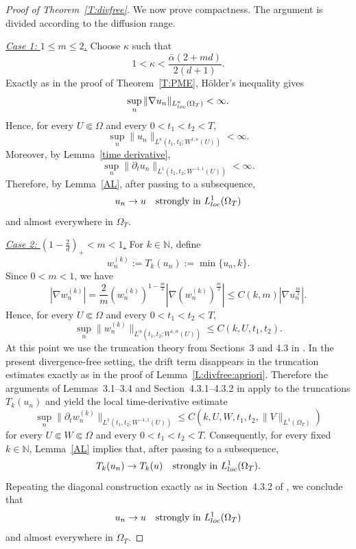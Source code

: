 \documentclass{amsart}
\numberwithin{equation}{section}
\begin{document}
\begin{proof}[Proof of Theorem~\ref{T:divfree}]
We now prove compactness. The argument is divided according to the diffusion
range.

\smallskip
\noindent
\underline{\emph{Case 1: $1\le m\le2$.}}
Choose $\kappa$ such that
\[
1<\kappa<\frac{\bar\alpha(2+md)}{2(d+1)}.
\]
Exactly as in the proof of Theorem~\ref{T:PME}, H\"{o}lder's inequality gives
\[
\sup_n \|\nabla u_n\|_{L^\kappa_{\rm loc}(\Omega_T)}<\infty.
\]
Hence, for every $U\Subset\Omega$ and every $0<t_1<t_2<T$,
\[
\sup_n \|u_n\|_{L^\kappa(t_1,t_2;W^{1,\kappa}(U))}<\infty.
\]
Moreover, by Lemma~\ref{time derivative},
\[
\sup_n \|\partial_t u_n\|_{L^1(t_1,t_2;W^{-1,1}(U))}<\infty.
\]
Therefore, by Lemma~\ref{AL}, after passing to a subsequence,
\[
u_n\to u
\quad \text{strongly in }L^1_{\rm loc}(\Omega_T)
\]
and almost everywhere in $\Omega_T$.


\smallskip
\noindent
\underline{\emph{Case 2: $\left(1-\frac{2}{d}\right)_+<m<1$.}}
For $k\in\mathbb N$, define
\[
w_n^{(k)}:=T_k(u_n):=\min\{u_n,k\}.
\]
Since $0<m<1$, we have
\[
|\nabla w_n^{(k)}|
=
\frac{2}{m}\left(w_n^{(k)}\right)^{1-\frac m2}
\left|\nabla \left(w_n^{(k)}\right)^{\frac m2}\right|
\le
C(k,m)\left|\nabla u_n^{\frac m2}\right|.
\]
Hence, for every $U\Subset\Omega$ and every $0<t_1<t_2<T$,
\begin{equation}\label{divfree-trunc-grad}
\sup_n \|w_n^{(k)}\|_{L^{\bar\alpha}(t_1,t_2;W^{1,\bar\alpha}(U))}\le C(k,U,t_1,t_2).
\end{equation}
At this point we use the truncation theory from Sections~3 and 4.3 in \cite{BDG15}. In the present divergence-free setting, the drift term disappears in the truncation estimates exactly as in the proof of Lemma~\ref{L:divfree:apriori}. Therefore the arguments of Lemmas~3.1--3.4 and Section~4.3.1--4.3.2 in \cite{BDG15} apply to the truncations $T_k(u_n)$ and yield the local time-derivative estimate
\begin{equation}\label{divfree-trunc-time}
\sup_n
\|\partial_t w_n^{(k)}\|_{L^1(t_1,t_2;W^{-1,1}(U))}
\le
C(k,U,W,t_1,t_2, \|V\|_{L^{1}(\Omega_T)})
\end{equation}
for every $U\Subset W\Subset\Omega$ and every $0<t_1<t_2<T$. Consequently, for every fixed $k\in\mathbb N$, Lemma~\ref{AL} implies that, after passing to a subsequence,
\[
T_k(u_n)\to T_k(u)
\quad \text{strongly in }L^1_{\rm loc}(\Omega_T).
\]
Repeating the diagonal construction exactly as in Section~4.3.2 of \cite{BDG15}, we conclude that
\[
u_n\to u
\quad \text{strongly in }L^1_{\rm loc}(\Omega_T)
\]
and almost everywhere in $\Omega_T$.




\end{proof}
\end{document}
